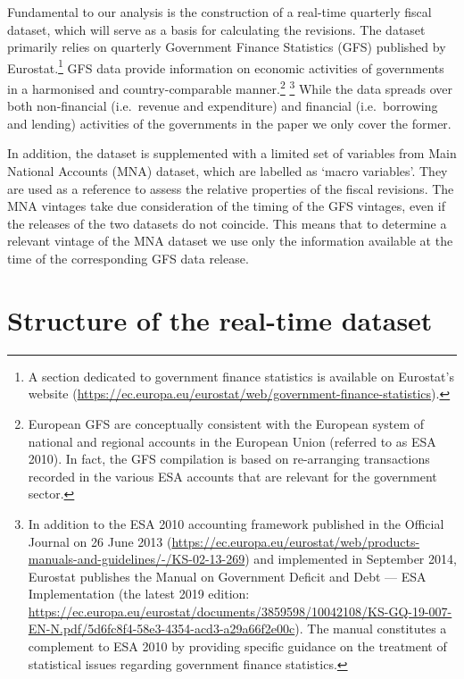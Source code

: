 \documentclass[
  letterpaper,
  authoryear,
  preprint,
  3p]{elsarticle}
\begin{document}
Fundamental to our analysis is the construction of a real-time quarterly
fiscal dataset, which will serve as a basis for calculating the
revisions. The dataset primarily relies on quarterly Government Finance
Statistics (GFS) published by Eurostat.\footnote{A section dedicated to
  government finance statistics is available on Eurostat's website
  (\url{https://ec.europa.eu/eurostat/web/government-finance-statistics}).}
GFS data provide information on economic activities of governments in a
harmonised and country-comparable manner.\footnote{European GFS are
  conceptually consistent with the European system of national and
  regional accounts in the European Union (referred to as ESA 2010). In
  fact, the GFS compilation is based on re-arranging transactions
  recorded in the various ESA accounts that are relevant for the
  government sector.} \footnote{In addition to the ESA 2010 accounting
  framework published in the Official Journal on 26 June 2013
  (\url{https://ec.europa.eu/eurostat/web/products-manuals-and-guidelines/-/KS-02-13-269})
  and implemented in September 2014, Eurostat publishes the Manual on
  Government Deficit and Debt --- ESA Implementation (the latest 2019
  edition:
  \url{https://ec.europa.eu/eurostat/documents/3859598/10042108/KS-GQ-19-007-EN-N.pdf/5d6fc8f4-58e3-4354-acd3-a29a66f2e00c}).
  The manual constitutes a complement to ESA 2010 by providing specific
  guidance on the treatment of statistical issues regarding government
  finance statistics.} While the data spreads over both non-financial
(i.e.~revenue and expenditure) and financial (i.e.~borrowing and
lending) activities of the governments in the paper we only cover the
former.

In addition, the dataset is supplemented with a limited set of variables
from Main National Accounts (MNA) dataset, which are labelled as `macro
variables'. They are used as a reference to assess the relative
properties of the fiscal revisions. The MNA vintages take due
consideration of the timing of the GFS vintages, even if the releases of
the two datasets do not coincide. This means that to determine a
relevant vintage of the MNA dataset we use only the information
available at the time of the corresponding GFS data release.

\hypertarget{sec-Structure-of-the-real-time-dataset}{%
\section{Structure of the real-time
dataset}\label{sec-Structure-of-the-real-time-dataset}}
\end{document}
